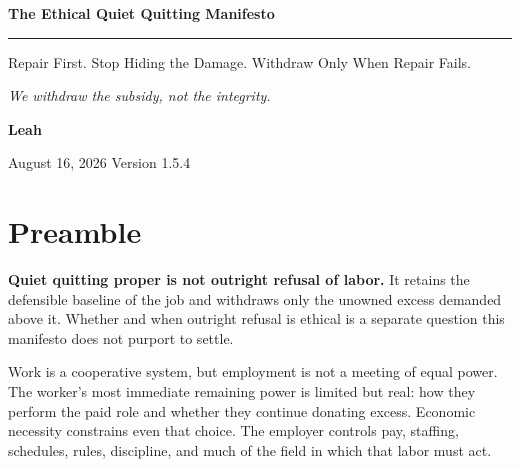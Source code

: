 \documentclass[11pt,oneside]{article}
\begin{document}
\hypersetup{pageanchor=false}

\begin{titlepage}
\thispagestyle{empty}
\vspace*{0.9in}

{\sffamily\bfseries\fontsize{31}{36}\selectfont\color{ManifestInk}
The Ethical Quiet Quitting Manifesto\par}

\vspace{0.5em}
{\color{ManifestRule}\rule{\textwidth}{1.2pt}}
\vspace{1.0em}

{\sffamily\fontsize{17}{23}\selectfont\color{ManifestGray}
Repair First. Stop Hiding the Damage. Withdraw Only When Repair
Fails.\par}

\vfill

\begin{tcolorbox}[
  enhanced,
  colback=ManifestLight,
  colframe=ManifestRule,
  boxrule=0pt,
  leftrule=4pt,
  arc=0pt,
  left=14pt,right=14pt,top=13pt,bottom=13pt
]
{\Large\itshape We withdraw the subsidy, not the integrity.}
\end{tcolorbox}
\vfill

{\sffamily\large\bfseries Leah\par}
\vspace{0.2em}
{\sffamily\color{ManifestGray}August 16, 2026 \quad Version 1.5.4\par}
\vspace{0.55in}
\end{titlepage}

\thispagestyle{plain}
\tableofcontents
\clearpage
{}
\hypersetup{pageanchor=true}

\hypertarget{preamble}{%
\section{Preamble}\label{preamble}}

\textbf{Quiet quitting proper is not outright refusal of labor.} It
retains the defensible baseline of the job and withdraws only the
unowned excess demanded above it. Whether and when outright refusal is
ethical is a separate question this manifesto does not purport to
settle.

Work is a cooperative system, but employment is not a meeting of equal
power. The worker's most immediate remaining power is limited but real:
how they perform the paid role and whether they continue donating
excess. Economic necessity constrains even that choice. The employer
controls pay, staffing, schedules, rules, discipline, and much of the
field in which that labor must act.
\end{document}
